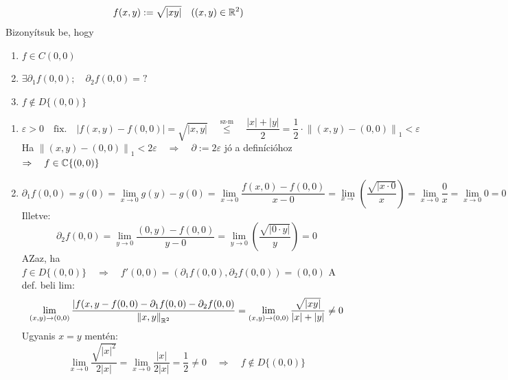 \documentclass[a4paper,11.5pt]{article}
\newcommand{\norm}[1]{\left\lVert#1\right\rVert}
\begin{document}
	\begin{task}
		\[ f(x,y):=\sqrt{|xy|}\quad ((x,y)\in\mathbb{R}^2) \]
		Bizonyítsuk be, hogy \begin{enumerate}
			\item $f\in C(0,0)$
			\item $\exists\partial_1f(0,0);\quad \partial_2f(0,0)=?$
			\item $f\notin D\{(0,0)\}$
		\end{enumerate}
		\begin{enumerate}
			\item 
			\[ \varepsilon>0\quad \text{fix.}\quad |f(x,y)-f(0,0)|=\sqrt{|x,y|}\quad \overset{\text{sz-m}}{\leq}\quad \frac{|x|+|y|}{2}=\frac{1}{2}\cdot\norm{(x,y)-(0,0)}_1<\varepsilon \]
			Ha $\norm{(x,y)-(0,0)}_1<2\varepsilon\quad \Rightarrow\quad \partial:=2\varepsilon$ jó a definícióhoz\quad $\Rightarrow\quad f\in\mathbb{C}\{(0,0)\}$
			\item \[\partial_1f(0,0)=g(0)=\lim_{x\to0}g(y)-g(0)=\lim_{x\to0}\frac{f(x,0)-f(0,0)}{x-0}=\lim_{x\to}\left(\frac{\sqrt{|x\cdot0}}{x}\right)=\lim_{x\to0}\frac{0}{x}=\lim_{x\to0}0=0 \]
			Illetve:
			\[ \partial_2f(0,0)=\lim_{y\to0}\frac{(0,y)-f(0,0)}{y-0}=\lim_{y\to0}\left(\frac{\sqrt{|0\cdot y|}}{y}\right)=0 \]
			AZaz, ha $f\in D\{(0,0)\}\quad \Rightarrow\quad f'(0,0)=(\partial_1f(0,0), \partial_2f(0,0))=(0,0)$
			A def. beli lim:
			\[ \lim_{(x,y)\to(0,0)}\frac{|f(x,y-f(0,0)-\partial_1f(0,0)-\partial_2f(0,0)}{\norm{x,y}_{\R^2}}=\lim_{(x,y)\to(0,0)}\frac{\sqrt{|xy|}}{|x|+|y|}\not=0 \]
			Ugyanis $x=y$ mentén:
			\[ \lim_{x\to0}\frac{\sqrt{|x|^2}}{2|x|}=\lim_{x\to0}\frac{|x|}{2|x|}=\frac{1}{2}\not=0\quad \Rightarrow\quad f\notin D\{(0,0)\} \]
		\end{enumerate}
	\end{task}
\end{document}
